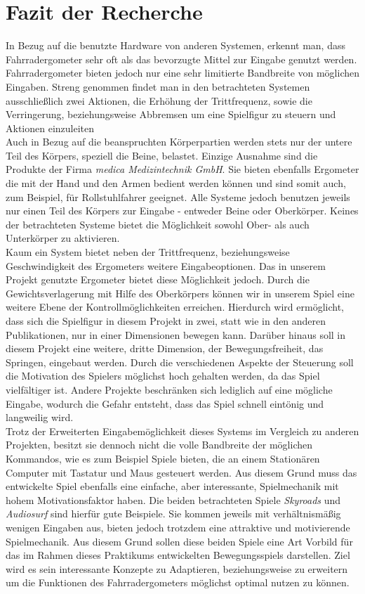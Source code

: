 \section{Fazit der Recherche}
In Bezug auf die benutzte Hardware von anderen Systemen, erkennt man, dass Fahrradergometer sehr oft als das bevorzugte Mittel zur Eingabe genutzt werden. Fahrradergometer bieten jedoch nur eine sehr limitierte Bandbreite von möglichen Eingaben. Streng genommen findet man in den betrachteten Systemen ausschließlich zwei Aktionen, die Erhöhung der Trittfrequenz, sowie die Verringerung, beziehungsweise Abbremsen um eine Spielfigur zu steuern und Aktionen einzuleiten \\
Auch in Bezug auf die beanspruchten Körperpartien werden stets nur der untere Teil des Körpers, speziell die Beine, belastet. Einzige Ausnahme sind die Produkte der Firma \textit{medica Medizintechnik GmbH}. Sie bieten ebenfalls Ergometer die mit der Hand und den Armen bedient werden können und sind somit auch, zum Beispiel, für Rollstuhlfahrer geeignet. Alle Systeme jedoch benutzen jeweils nur einen Teil des Körpers zur Eingabe - entweder Beine oder Oberkörper. Keines der betrachteten Systeme bietet die Möglichkeit sowohl Ober- als auch Unterkörper zu aktivieren. \\
Kaum ein System bietet neben der Trittfrequenz, beziehungsweise Geschwindigkeit des Ergometers weitere Eingabeoptionen. Das in unserem Projekt genutzte Ergometer bietet diese Möglichkeit jedoch. Durch die Gewichtsverlagerung mit Hilfe des Oberkörpers können wir in unserem Spiel eine weitere Ebene der Kontrollmöglichkeiten erreichen. Hierdurch wird ermöglicht, dass sich die Spielfigur in diesem Projekt in zwei, statt wie in den anderen Publikationen, nur in einer Dimensionen bewegen kann. Darüber hinaus soll in diesem Projekt eine weitere, dritte Dimension, der Bewegungsfreiheit, das Springen, eingebaut werden. Durch die verschiedenen Aspekte der Steuerung soll die Motivation des Spielers möglichst hoch gehalten werden, da das Spiel vielfältiger ist. Andere Projekte beschränken sich lediglich auf eine mögliche Eingabe, wodurch die Gefahr entsteht, dass das Spiel schnell eintönig und langweilig wird.\\
Trotz der Erweiterten Eingabemöglichkeit dieses Systems im Vergleich zu anderen Projekten, besitzt sie dennoch nicht die volle Bandbreite der möglichen Kommandos, wie es zum Beispiel Spiele bieten, die an einem Stationären Computer mit Tastatur und Maus gesteuert werden. Aus diesem Grund muss das entwickelte Spiel ebenfalls eine einfache, aber interessante, Spielmechanik mit hohem Motivationsfaktor haben. Die beiden betrachteten Spiele \textit{Skyroads} und \textit{Audiosurf} sind hierfür gute Beispiele. Sie kommen jeweils mit verhältnismäßig wenigen Eingaben aus, bieten jedoch trotzdem eine attraktive und motivierende Spielmechanik. Aus diesem Grund sollen diese beiden Spiele eine Art Vorbild für das im Rahmen dieses Praktikums entwickelten Bewegungsspiels darstellen. Ziel wird es sein interessante Konzepte zu Adaptieren, beziehungsweise zu erweitern um die Funktionen des Fahrradergometers möglichst optimal nutzen zu können.
